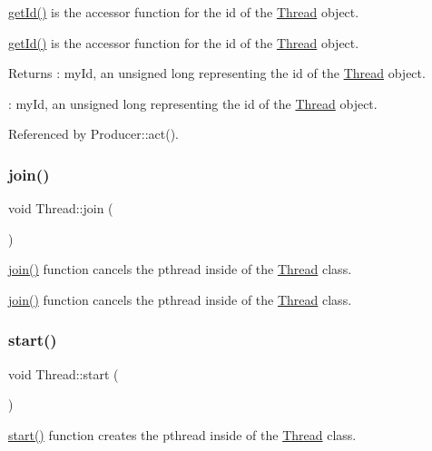 \hyperlink{class_thread_aca302203fb0d46f6ea42bb49f689f6a6}{get\+Id()} is the accessor function for the id of the \hyperlink{class_thread}{Thread} object. 

\hyperlink{class_thread_aca302203fb0d46f6ea42bb49f689f6a6}{get\+Id()} is the accessor function for the id of the \hyperlink{class_thread}{Thread} object. \begin{DoxyReturn}{Returns}
\+: my\+Id, an unsigned long representing the id of the \hyperlink{class_thread}{Thread} object.

\+: my\+Id, an unsigned long representing the id of the \hyperlink{class_thread}{Thread} object. 
\end{DoxyReturn}


Referenced by Producer\+::act().

\mbox{\label{class_thread_a4d9d788e98388a3217831a9046709deb}} 
\subsubsection{\texorpdfstring{join()}{join()}}
{\footnotesize\ttfamily void Thread\+::join (\begin{DoxyParamCaption}{ }\end{DoxyParamCaption})}



\hyperlink{class_thread_a4d9d788e98388a3217831a9046709deb}{join()} function cancels the pthread inside of the \hyperlink{class_thread}{Thread} class. 

\hyperlink{class_thread_a4d9d788e98388a3217831a9046709deb}{join()} function cancels the pthread inside of the \hyperlink{class_thread}{Thread} class. \mbox{\label{class_thread_a1f53ee62bd30a7924186ef26150ce262}} 
\subsubsection{\texorpdfstring{start()}{start()}}
{\footnotesize\ttfamily void Thread\+::start (\begin{DoxyParamCaption}{ }\end{DoxyParamCaption})}



\hyperlink{class_thread_a1f53ee62bd30a7924186ef26150ce262}{start()} function creates the pthread inside of the \hyperlink{class_thread}{Thread} class. 

